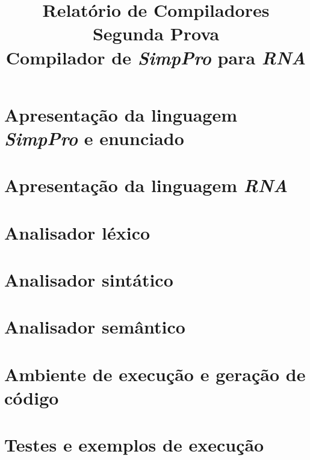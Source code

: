 \documentclass[12pt,oneside,a4paper,english]{abntex2}
\title{Relatório de Compiladores\\Segunda Prova\\Compilador de \emph{SimpPro} para \emph{RNA}}
\begin{document}
\frenchspacing %

\imprimirfolhaderosto

\tableofcontents

\textual

\chapter{Apresentação da linguagem \emph{SimpPro} e enunciado}
\label{chap:linguagem-simppro}
	
	
\chapter{Apresentação da linguagem \emph{RNA}}
\label{chap:linguagem-rna}
	

\chapter{Analisador léxico}
\label{chap:lexico}
	
	
\chapter{Analisador sintático}
\label{chap:sintatico}
	

\chapter{Analisador semântico}
\label{chap:semantico}
	

\chapter{Ambiente de execução e geração de código}
\label{chap:testes}
	

\chapter{Testes e exemplos de execução}
\label{chap:exemplo}
	
\end{document}
